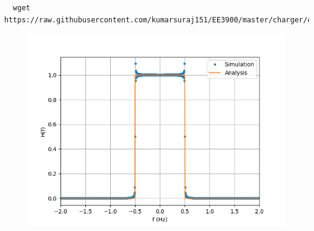 \documentclass[journal,12pt,twocolumn]{IEEEtran}
\renewcommand\thesection{\arabic{section}}
\begin{document}
\begin{enumerate}[label=\thesection.\arabic*
,ref=\thesection.\theenumi]
\begin{lstlisting}
  wget https://raw.githubusercontent.com/kumarsuraj151/EE3900/master/charger/codes/1.1.py
\end{lstlisting}
\begin{figure}[!ht]
  \centering
  \includegraphics[width=\columnwidth]{./figs/3.10}
  \caption{}
\end{figure}
\end{enumerate}
\end{document}
